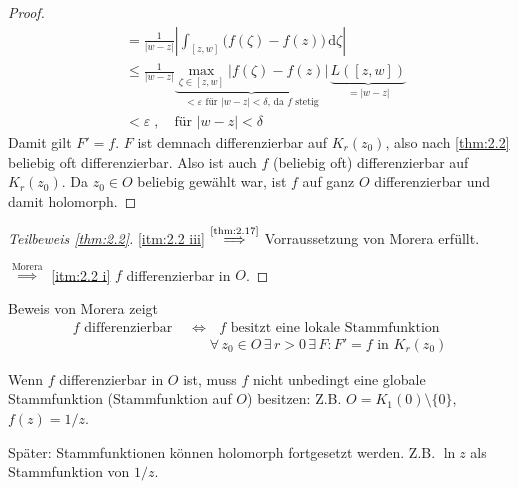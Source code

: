 \begin{theorem}
\begin{proof}
    \begin{align*}
      &= \frac{1}{|w - z|} \left| \int_{[z,w]} \Big( f(\zeta) - f(z) \Big) \, \mathrm{d}\zeta \right| \\
      &\leq \frac{1}{|w - z|} \underbrace{\max\limits_{\zeta \in [z,w]} \Big|f(\zeta) - f(z)\Big|}_{< \varepsilon \text{ für } |w-z| < \delta \text{, da $f$ stetig}} \, \underbrace{L([z,w])}_{=|w-z|} \\
      &< \varepsilon \; , \quad \text{für } |w-z| < \delta
    \end{align*}
    Damit gilt $F' = f$. 
    $F$ ist demnach differenzierbar auf $K_r(z_0)$, also nach \ref{thm:2.2} beliebig oft differenzierbar.
    Also ist auch $f$ (beliebig oft) differenzierbar auf $K_r(z_0)$.
    Da $z_0\in O$ beliebig gewählt war, ist $f$ auf ganz $O$ differenzierbar und damit holomorph.
  \end{proof}
\end{theorem}


\begin{proof}[Teilbeweis \ref{thm:2.2}]
  \ref{itm:2.2 iii} $\overset{\text{\ref{thm:2.17}}}{\implies}$ Vorraussetzung von Morera erfüllt.
  
  $\overset{\text{Morera}}{\implies}$ \ref{itm:2.2 i} $f$ differenzierbar in $O$.
\end{proof}

\begin{notice}
  \begin{enum-arab}
    \item Beweis von Morera zeigt
    \begin{align*}
      \text{$f$ differenzierbar } &\iff \text{ $f$ besitzt eine lokale Stammfunktion} \\
      &\phantom{\iff} \forall \, z_0 \in O \, \exists \, r > 0 \, \exists \, F : F' = f \text{ in } K_r(z_0)
    \end{align*}
    
    \item Wenn $f$ differenzierbar in $O$ ist, muss $f$ nicht unbedingt eine globale Stammfunktion (Stammfunktion auf $O$) besitzen: Z.B. $O = K_1(0) \setminus \{0\}$, $f(z) = 1/z$.
    
    Später: Stammfunktionen können holomorph fortgesetzt werden. Z.B. $\ln z$ als Stammfunktion von $1/z$.
  \end{enum-arab}
\end{notice}

